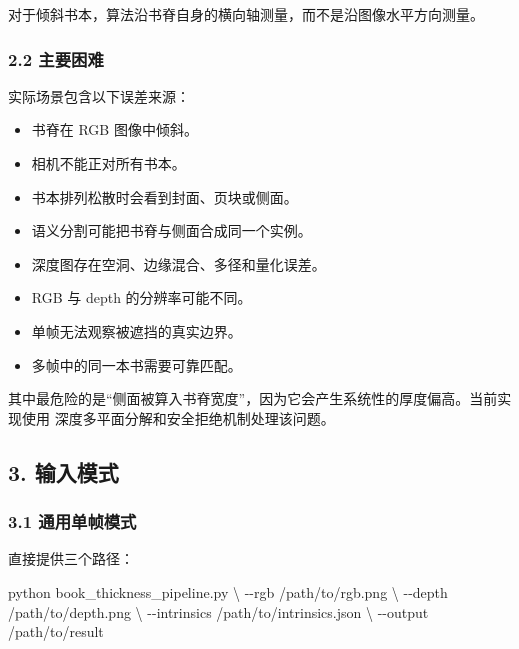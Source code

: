 \documentclass[
  chinese,
  11pt,
  a4paper,
]{article}
\newenvironment{Shaded}{\begin{snugshade}}{\end{snugshade}}
\newcommand{\AttributeTok}[1]{\textcolor[rgb]{0.13,0.29,0.53}{#1}}
\newcommand{\DataTypeTok}[1]{\textcolor[rgb]{0.13,0.29,0.53}{#1}}
\newcommand{\ExtensionTok}[1]{#1}
\newcommand{\NormalTok}[1]{#1}
\providecommand{\tightlist}{%
  \setlength{\itemsep}{0pt}\setlength{\parskip}{0pt}}
\begin{document}
对于倾斜书本，算法沿书脊自身的横向轴测量，而不是沿图像水平方向测量。

\subsubsection{2.2 主要困难}\label{22-ux4e3bux8981ux56f0ux96be}

实际场景包含以下误差来源：

\begin{itemize}
\tightlist
\item
  书脊在 RGB 图像中倾斜。
\item
  相机不能正对所有书本。
\item
  书本排列松散时会看到封面、页块或侧面。
\item
  语义分割可能把书脊与侧面合成同一个实例。
\item
  深度图存在空洞、边缘混合、多径和量化误差。
\item
  RGB 与 depth 的分辨率可能不同。
\item
  单帧无法观察被遮挡的真实边界。
\item
  多帧中的同一本书需要可靠匹配。
\end{itemize}

其中最危险的是``侧面被算入书脊宽度''，因为它会产生系统性的厚度偏高。当前实现使用
深度多平面分解和安全拒绝机制处理该问题。

\subsection{3. 输入模式}\label{3-ux8f93ux5165ux6a21ux5f0f}

\subsubsection{3.1
通用单帧模式}\label{31-ux901aux7528ux5355ux5e27ux6a21ux5f0f}

直接提供三个路径：

\begin{Shaded}
\begin{Highlighting}[]
\ExtensionTok{python}\NormalTok{ book\_thickness\_pipeline.py }\DataTypeTok{\textbackslash{}}
  \AttributeTok{{-}{-}rgb}\NormalTok{ /path/to/rgb.png }\DataTypeTok{\textbackslash{}}
  \AttributeTok{{-}{-}depth}\NormalTok{ /path/to/depth.png }\DataTypeTok{\textbackslash{}}
  \AttributeTok{{-}{-}intrinsics}\NormalTok{ /path/to/intrinsics.json }\DataTypeTok{\textbackslash{}}
  \AttributeTok{{-}{-}output}\NormalTok{ /path/to/result}
\end{Highlighting}
\end{Shaded}
\end{document}
